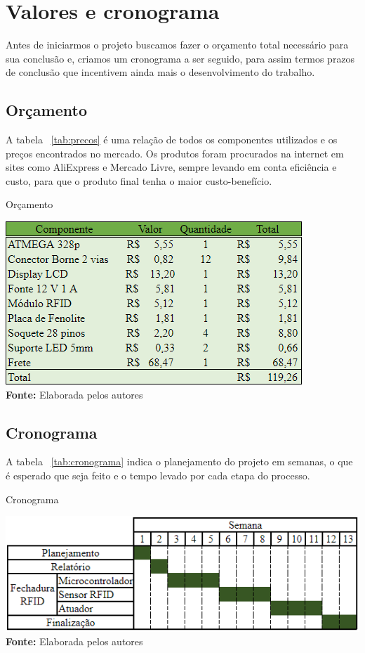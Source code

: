 \chapter{Valores e cronograma}
Antes de iniciarmos o projeto buscamos fazer o orçamento
total necessário para sua conclusão e, criamos um cronograma
a ser seguido, para assim termos prazos de conclusão que incentivem
ainda mais o desenvolvimento do trabalho.

\section{Orçamento}
A tabela ~\ref{tab:precos} é uma relação de todos os componentes utilizados e os preços
encontrados no mercado. Os produtos foram procurados na internet em sites como 
AliExpress e Mercado Livre, sempre levando em conta eficiência e custo, para que o
produto final tenha o maior custo-benefício.

\FloatBarrier
\begin{table}[!htbp]
	\centering
	\caption{Orçamento}
	\includegraphics[scale=.75]{imagens/precos}
	\\ \vspace{0.2cm}
	\textbf{Fonte:} Elaborada pelos autores
	\label{tab:precos}
\end{table}
\FloatBarrier

\section{Cronograma}
A tabela ~\ref{tab:cronograma} indica o planejamento do projeto em semanas, o que é esperado que
seja feito e o tempo levado por cada etapa do processo.

\FloatBarrier
\begin{table}[!htbp]
	\centering
	\caption{Cronograma}
	\includegraphics[scale=.75]{imagens/cronograma}
	\\ \vspace{0.2cm}
	\textbf{Fonte:} Elaborada pelos autores
	\label{tab:cronograma}
\end{table}
\FloatBarrier